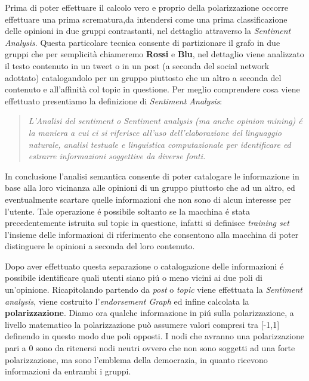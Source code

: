 Prima di poter effettuare il calcolo vero e proprio della polarizzazione occorre effettuare una prima scrematura,da intendersi come una prima classificazione delle opinioni in due gruppi contrastanti, nel dettaglio attraverso la \textit{Sentiment Analysis}. Questa particolare tecnica consente di partizionare il grafo in due gruppi che per semplicità chiameremo \textbf{Rossi} e \textbf{Blu}, nel dettaglio viene analizzato il testo contenuto in un tweet o in un post (a seconda del social network adottato) catalogandolo per un gruppo piuttosto che un altro a seconda del contenuto e all'affinità col topic in questione. 
Per meglio comprendere cosa viene effettuato presentiamo la definizione di \textit{Sentiment Analysis}:
\begin{quote}
\textit{L'Analisi del sentiment o Sentiment analysis (ma anche opinion mining) \'e la maniera a cui ci si riferisce all'uso dell'elaborazione del linguaggio naturale, analisi testuale e linguistica computazionale per identificare ed estrarre informazioni soggettive da diverse fonti.} 
\end{quote}

In conclusione l'analisi semantica consente di poter catalogare le informazione in base alla loro vicinanza alle opinioni di un gruppo piuttosto che ad un altro, ed eventualmente scartare quelle informazioni che non sono di alcun interesse per l'utente. Tale operazione \'e possibile soltanto se la macchina \'e stata precedentemente istruita sul topic in questione, infatti si definisce \textit{training set} l'insieme delle informazioni di riferimento che consentono alla macchina di poter distinguere le opinioni a seconda del loro contenuto.

Dopo aver effettuato questa separazione o catalogazione delle informazioni \'e possibile identificare quali utenti siano pi\'u o meno vicini ai due poli di un'opinione. Ricapitolando partendo da \textit{post} o \textit{topic} viene effettuata la \textit{Sentiment analysis}, viene costruito l'\textit{endorsement Graph} ed infine calcolata la \textbf{polarizzazione}.
Diamo ora qualche informazione in pi\'u sulla polarizzazione, a livello matematico la polarizzazione può assumere valori compresi tra [-1,1] definendo in questo modo due poli opposti. I nodi che avranno una polarizzazione pari a 0 sono da ritenersi nodi neutri ovvero che non sono soggetti ad una forte polarizzazione, ma sono l'emblema della democrazia, in quanto ricevono informazioni da entrambi i gruppi.


